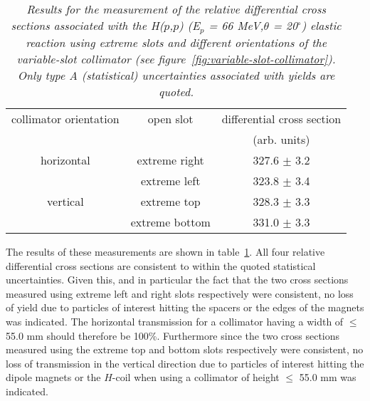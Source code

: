 \documentclass[11pt]{report}
\begin{document}
\begin{table}[h]
\begin{center}
\begin{tabular}{|c|c|c|}
\hline
\multicolumn{1}{|c|}{collimator orientation}
&\multicolumn{1}{|c|}{open slot} 
&\multicolumn{1}{|c|}{differential cross section}\\ 
& & (arb. units) \\ \hline\hline
horizontal & extreme right &  327.6 $\pm$ 3.2  \\
           & extreme left  &  323.8  $\pm$ 3.4  \\ \hline
vertical   & extreme top   &  328.3  $\pm$ 3.3   \\
           & extreme bottom & 331.0 $\pm$ 3.3   \\ \hline
\end{tabular}  
\end{center}
\caption[Relative differential cross section measured
using the variable-slot collimator.]
{{\em Results for the measurement of the relative
differential cross sections associated with the 
H($p$,$p$) (E$_{p}$ = 66 MeV,$\theta$ = 20$^{\circ}$) 
elastic
reaction 
using extreme slots and different 
orientations of the variable-slot collimator (see figure~\ref{fig:variable-slot-collimator}).
Only type A (statistical) 
uncertainties associated with yields are quoted.}}
\label{t:relcros}
\end{table}



The results of these measurements are 
shown in table~\ref{t:relcros}. All four 
relative differential cross sections are consistent to within the
quoted statistical uncertainties.
Given this, and in particular the fact that the two cross sections 
measured using extreme left and right slots respectively were consistent, 
no loss of yield due to particles of interest hitting the spacers or the
edges of the magnets was indicated. The horizontal
transmission for a collimator having a width of
$\leq$ 55.0 mm should therefore be 100\%. Furthermore since the 
two cross sections measured using the extreme top and bottom slots 
respectively were consistent, no loss of transmission in the vertical 
direction due to particles of interest hitting the
dipole magnets or the $H$-coil when
using a collimator of height $\leq$ 55.0 mm was indicated.


\end{document}
